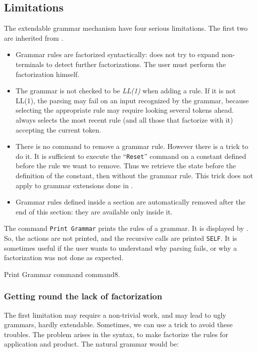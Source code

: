 \subsection{Limitations}

The extendable grammar mechanism have four serious limitations. The
first two are inherited from {\camlpppp}.
\begin{itemize}
\item Grammar rules are factorized syntactically: {\camlpppp} does not
  try to expand non-terminals to detect further factorizations. The
  user must perform the factorization himself.
\item The grammar is not checked to be \emph{LL(1)} when
  adding a rule.  If it is not LL(1), the parsing may fail on an input
  recognized by the grammar, because selecting the appropriate rule
  may require looking several tokens ahead. {\camlpppp} always selects
  the most recent rule (and all those that factorize with it)
  accepting the current token.
\item There is no command to remove a grammar rule. However there is a
  trick to do it. It is sufficient to execute the ``{\tt Reset}''
  command on a constant defined before the rule we want to remove.
  Thus we retrieve the state before the definition of the constant,
  then without the grammar rule. This trick does not apply to grammar
  extensions done in {\ocaml}.
\item Grammar rules defined inside a section are automatically removed
  after the end of this section: they are available only inside it.
\end{itemize}

The command {\tt Print Grammar} prints the rules of a grammar. It is
displayed by {\camlpppp}. So, the actions are not printed, and the
recursive calls are printed \verb+SELF+. It is
sometimes useful if the user wants to understand why parsing fails, or
why a factorization was not done as expected.

\begin{coq_example}
Print Grammar command command8.
\end{coq_example}

\subsubsection{Getting round the lack of factorization}
The first limitation may require a non-trivial work, and may lead to
ugly grammars, hardly extendable. Sometimes, we can use a trick to
avoid these troubles. The problem arises in the {\gallina} syntax, to
make {\camlpppp} factorize the rules for application and product. The
natural grammar would be:

